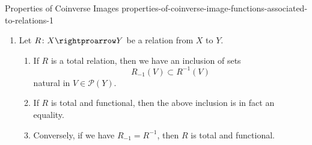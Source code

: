 \begin{proposition}{Properties of Coinverse Images \rmI}{properties-of-coinverse-image-functions-associated-to-relations-1}
\begin{enumerate}
            \[
                R_{-1}(V)%
                =%
                X\setminus R^{-1}(Y\setminus V)
            \]%
            for each $V\in\mathcal{P}(Y)$.
        \item\label{properties-of-coinverse-image-functions-associated-to-relations-1-relation-to-inverse-images-2}Let $R\colon X\rightproarrow Y$ be a relation from $X$ to $Y$.
            \begin{enumerate}
                \item\label{properties-of-coinverse-image-functions-associated-to-relations-1-relation-to-inverse-images-2-a}If $R$ is a total relation, then we have an inclusion of sets
                    \[
                        R_{-1}(V)
                        \subset
                        R^{-1}(V)
                    \]%
                    natural in $V\in\mathcal{P}(Y)$.
                \item\label{properties-of-coinverse-image-functions-associated-to-relations-1-relation-to-inverse-images-2-b}If $R$ is total and functional, then the above inclusion is in fact an equality.
                \item\label{properties-of-coinverse-image-functions-associated-to-relations-1-relation-to-inverse-images-2-c}Conversely, if we have $R_{-1}=R^{-1}$, then $R$ is total and functional.
            \end{enumerate}
    \end{enumerate}
\end{proposition}
